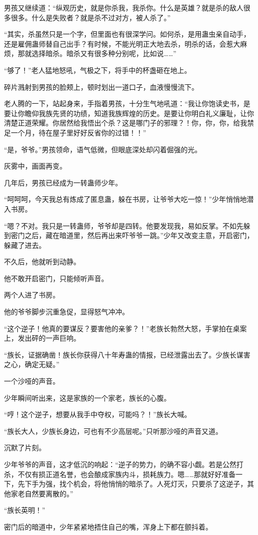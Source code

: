 \begin{this_body}
男孩又继续道：“纵观历史，就是你杀我，我杀你。什么是英雄？就是杀的敌人很多很多。什么是失败者？就是杀不过对方，被人杀了。”

“其实，杀虽然只是一个字，但里面也有很深学问。如何杀，是用蛊虫亲自动手，还是雇佣蛊师替自己出手？有时候，不能光明正大地去杀，明杀的话，会惹大麻烦，那就选择暗杀。暗杀又有很多种分别呢，比如说……”

“够了！”老人猛地怒吼，气极之下，将手中的杯盏砸在地上。

碎片溅射到男孩的脸颊上，顿时划出一道口子，血液慢慢流下。

老人腾的一下，站起身来，手指着男孩，十分生气地吼道：“我让你饱读史书，是要让你瞻仰我族先贤的功绩，知道我族辉煌的历史。是要让你明白礼义廉耻，让你清楚正道荣耀。你居然给我悟出个杀？这是哪门子的邪理？！你，你，你，给我禁足一个月，待在屋子里好好反省你的过错！！”

“是，爷爷。”男孩领命，语气低微，但眼底深处却闪着倔强的光。

灰雾中，画面再变。

几年后，男孩已经成为一转蛊师少年。

“呵呵呵，今天我总有炼成了匿息蛊，躲在书房，让爷爷大吃一惊！”少年悄悄地潜入书房。

“嗯？不对。我只是一转蛊师，爷爷却是四转。他要发现我，易如反掌。不如先躲到密门之后，藏在暗道里，然后再出来吓爷爷一跳。”少年又改变主意，开启密门，躲藏了进去。

不久后，他就听到动静。

他不敢开启密门，只能倾听声音。

两个人进了书房。

他的爷爷脚步沉重急促，显得怒气冲冲。

“这个逆子！他真的要谋反？要害他的亲爹？！”老族长勃然大怒，手掌拍在桌案上，发出砰的一声巨响。

“族长，证据确凿！族长你获得八十年寿蛊的情报，已经泄露出去了。少族长谋害之心，确定无疑。”

一个沙哑的声音。

少年瞬间听出来，这是家族的一个家老，族长的心腹。

“哼！这个逆子，想要从我手中夺权，可能吗？！”族长大喊。

“族长大人，少族长身边，可也有不少高层呢。”只听那沙哑的声音又道。

沉默了片刻。

少年爷爷的声音，这才低沉的响起：“逆子的势力，的确不容小觑。若是公然打杀，不仅有损正道名誉，也会酿成家族内斗，损耗族力。嗯……那就好好准备一下，先下手为强，找个机会，将他悄悄的暗杀了。人死灯灭，只要杀了这逆子，其他家老自然要离散的。”

“族长英明！”

密门后的暗道中，少年紧紧地捂住自己的嘴，浑身上下都在颤抖着。

\end{this_body}

